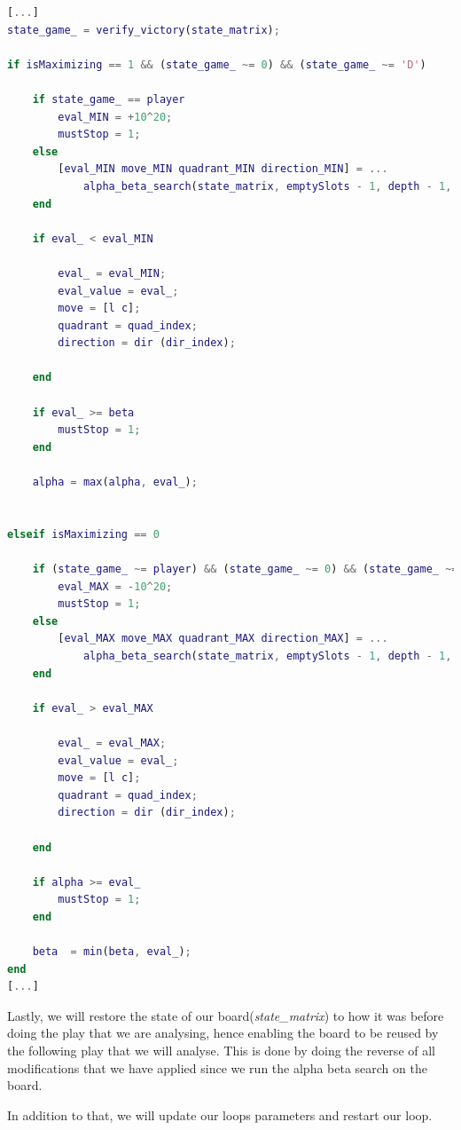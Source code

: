 \begin{lstlisting}[language=Matlab]
[...]
state_game_ = verify_victory(state_matrix);
                        
if isMaximizing == 1 && (state_game_ ~= 0) && (state_game_ ~= 'D')
    
    if state_game_ == player
        eval_MIN = +10^20;
        mustStop = 1;
    else
        [eval_MIN move_MIN quadrant_MIN direction_MIN] = ...
            alpha_beta_search(state_matrix, emptySlots - 1, depth - 1, alpha, beta, 0, player);                        
    end
    
    if eval_ < eval_MIN
        
        eval_ = eval_MIN;
        eval_value = eval_;
        move = [l c];
        quadrant = quad_index;
        direction = dir (dir_index);
        
    end
    
    if eval_ >= beta
        mustStop = 1;
    end
    
    alpha = max(alpha, eval_);
    
    
elseif isMaximizing == 0
    
    if (state_game_ ~= player) && (state_game_ ~= 0) && (state_game_ ~= 'D')
        eval_MAX = -10^20;
        mustStop = 1;
    else
        [eval_MAX move_MAX quadrant_MAX direction_MAX] = ...
            alpha_beta_search(state_matrix, emptySlots - 1, depth - 1, alpha, beta, 1, player);
    end
    
    if eval_ > eval_MAX
        
        eval_ = eval_MAX;
        eval_value = eval_;
        move = [l c];
        quadrant = quad_index;
        direction = dir (dir_index);
        
    end
    
    if alpha >= eval_
        mustStop = 1;
    end
    
    beta  = min(beta, eval_);
end
[...]
\end{lstlisting}

\vspace{10pt}

Lastly, we will restore the state of our board(\textit{state\_matrix}) to how it
was before doing the play that we are analysing, hence enabling the board to be
reused by the following play that we will analyse. This is done by doing the
reverse of all modifications that we have applied since we run the alpha beta
search on the board.

In addition to that, we will update our loops parameters and restart our loop.

